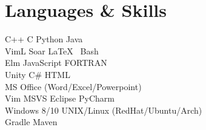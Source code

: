 \documentclass[letterpaper]{headers} %
\begin{document}
\begin{minipage}[t]{0.33\textwidth}
\section{Languages \& Skills}
	C++ \textbullet{} C \textbullet{} Python \textbullet{} Java \\
	VimL \textbullet{} Soar \textbullet{} \LaTeX\ \textbullet{} Bash \\
	Elm \textbullet{} JavaScript \textbullet{} FORTRAN \\
	Unity \textbullet{} C\# \textbullet{} HTML\\
	\sectionspace
	MS Office (Word/Excel/Powerpoint) \\
	Vim \textbullet{} MSVS \textbullet{} Eclipse \textbullet{} PyCharm \\
	Windows 8/10 \textbullet{} UNIX/Linux (RedHat/Ubuntu/Arch) \\
	Gradle \textbullet{} Maven
	
\end{minipage}
\hfill
%
\end{document}
